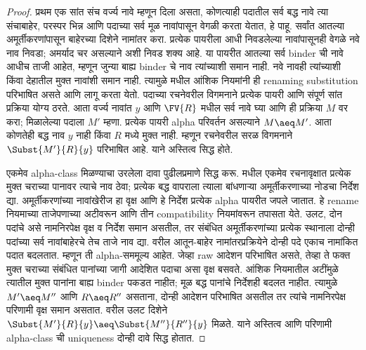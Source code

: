 \documentclass[../../../include/open-logic-section]{subfiles}
\begin{document}
\begin{proof}
प्रथम एक सांत संच वर्ज्य नावे म्हणून दिला असता, कोणत्याही
पदातील सर्व बद्ध नावे त्या संचाबाहेर, परस्पर भिन्न आणि
पदाच्या सर्व मूळ नावांपासून वेगळी करता येतात, हे पाहू.
सर्वांत आतल्या अमूर्तीकरणांपासून बाहेरच्या दिशेने नामांतर
करा. प्रत्येक पायरीला आधी निवडलेल्या नावांपासूनही वेगळे
नवे नाव निवडा; अमर्याद चर असल्याने अशी निवड शक्य आहे.
या पायरीत आतल्या सर्व binder ची नावे आधीच ताजी आहेत,
म्हणून जुन्या बाह्य binder चे नाव त्यांच्याशी समान नाही.
नवे नावही त्यांच्याशी किंवा देहातील मुक्त नावांशी समान नाही.
त्यामुळे  मधील आंशिक
नियमांनी ही renaming substitution परिभाषित असते आणि
 लागू करता येतो. पदाच्या रचनेवरील
विगमनाने प्रत्येक पायरी आणि संपूर्ण सांत प्रक्रिया योग्य ठरते.
आता वर्ज्य नावांत $y$ आणि $\FV{R}$ मधील सर्व नावे घ्या
आणि ही प्रक्रिया $M$ वर करा; मिळालेल्या पदाला $M'$ म्हणा.
प्रत्येक पायरी alpha परिवर्तन असल्याने $M\aeq M'$.
आता कोणतेही बद्ध नाव $y$ नाही किंवा $R$ मध्ये मुक्त नाही.
म्हणून रचनेवरील सरळ विगमनाने $\Subst{M'}{R}{y}$
परिभाषित आहे. याने अस्तित्व सिद्ध होते.

एकमेव alpha-class मिळण्याचा उरलेला दावा पुढीलप्रमाणे
सिद्ध करू.  मधील एकमेव रचनावृक्षात
प्रत्येक मुक्त चराच्या पानावर त्याचे नाव ठेवा; प्रत्येक बद्ध
वापराला त्याला बांधणाऱ्या अमूर्तीकरणाच्या नोडचा निर्देश द्या.
अमूर्तीकरणांच्या नावांखेरीज हा वृक्ष आणि हे निर्देश प्रत्येक
alpha पायरीत जपले जातात. हे rename नियमाच्या ताजेपणाच्या
अटीवरून आणि तीन compatibility नियमांवरून तपासता येते.
उलट, दोन पदांचे असे नामनिरपेक्ष वृक्ष व निर्देश समान असतील,
तर संबंधित अमूर्तीकरणांच्या प्रत्येक स्थानाला दोन्ही पदांच्या
सर्व नावांबाहेरचे तेच ताजे नाव द्या. वरील आतून-बाहेर
नामांतरप्रक्रियेने दोन्ही पदे एकाच नामांकित पदात बदलतात.
म्हणून ती alpha-सममूल्य आहेत.
जेव्हा raw आदेशन परिभाषित असते, तेव्हा ते फक्त मुक्त
चराच्या संबंधित पानांच्या जागी आदेशित पदाचा असा वृक्ष बसवते.
आंशिक नियमातील अटींमुळे त्यातील मुक्त पानांना बाह्य binder
पकडत नाहीत; मूळ बद्ध पानांचे निर्देशही बदलत नाहीत.
त्यामुळे $M'\aeq M''$ आणि $R\aeq R''$ असताना,
दोन्ही आदेशन परिभाषित असतील तर त्यांचे नामनिरपेक्ष
परिणामी वृक्ष समान असतात. वरील उलट दिशेने
$\Subst{M'}{R}{y}\aeq\Subst{M''}{R''}{y}$ मिळते.
याने अस्तित्व आणि परिणामी alpha-class ची uniqueness
दोन्ही दावे सिद्ध होतात.
\end{proof}
\end{document}
